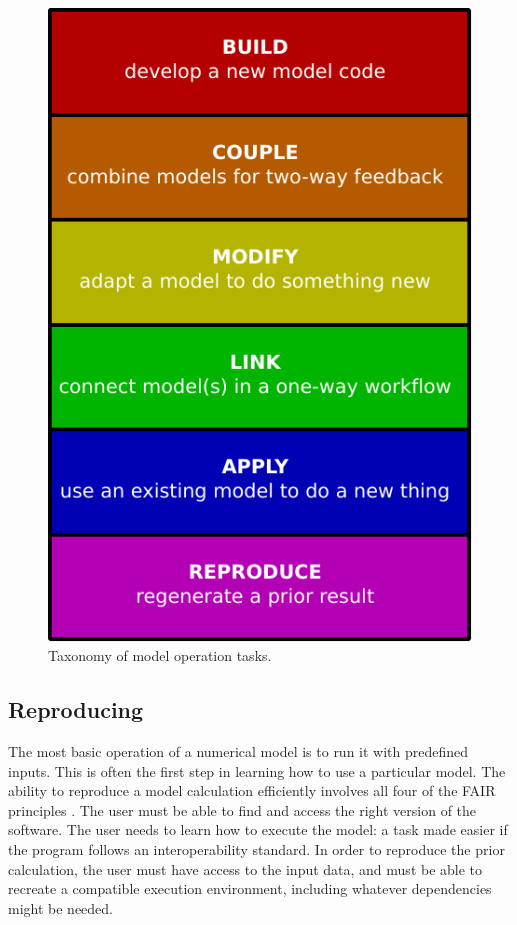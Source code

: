 \documentclass{article} %
\begin{document}
\begin{figure}[h!]
\centering
\includegraphics[scale=0.8]{Figures/model_operation_taxonomy.pdf}
\caption{Taxonomy of model operation tasks.}
\label{fig:taxonomy}
\end{figure}


\subsection{Reproducing}

The most basic operation of a numerical model is to run it with predefined inputs. This is often the first step in learning how to use a particular model. The ability to reproduce a model calculation efficiently involves all four of the FAIR principles \citep{wilkinson2016fair}. The user must be able to find and access the right version of the software. The user needs to learn how to execute the model: a task made easier if the program follows an interoperability standard. In order to reproduce the prior calculation, the user must have access to the input data, and must be able to recreate a compatible execution environment, including whatever dependencies might be needed.
\end{document}
